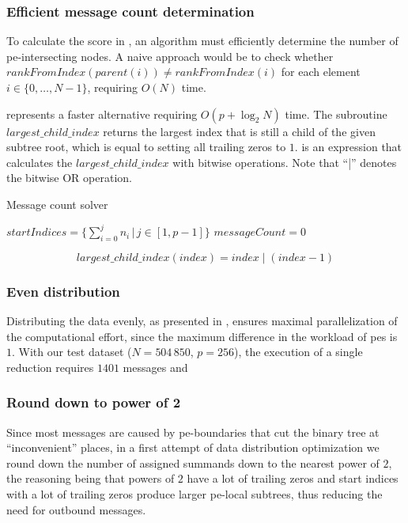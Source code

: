 \subsubsection{Efficient message count determination}
To calculate the score in , an algorithm must efficiently determine the number of \gls{pe}-intersecting nodes.
A naive approach would be to check whether $rankFromIndex(parent(i)) \neq rankFromIndex(i)$ for each element $i \in \{0, \ldots, N-1\}$, requiring $O(N)$ time.

 represents a faster alternative requiring $O(p + \log_2 N)$ time.
The subroutine $largest\_child\_index$ returns the largest index that is still a child of the given subtree root, which is equal to setting all trailing zeros to $1$.
 is an expression that calculates the $largest\_child\_index$ with bitwise operations.
Note that \enquote{|} denotes the bitwise OR operation.
\begin{algorithm}
\caption{Message count solver}\label{algo:MessageCountSolver}
\DontPrintSemicolon
\SetAlgoLined
$startIndices = \{\sum_{i=0}^j n_i \,\big|\, j \in [1, p-1] \}$\;
$messageCount = 0$\;
\end{algorithm}
\begin{equation}
\label{eq:LargestChildIndex}
largest\_child\_index(index) = index \;|\; (index - 1)
\end{equation}


\subsubsection{Even distribution}
Distributing the data evenly, as presented in , ensures maximal parallelization of the computational effort, since the maximum difference in the workload of \glspl{pe} is $1$.
With our test dataset ($N = 504\,850$, $p=256$), the execution of a single reduction requires $1401$ messages and 

\subsubsection{Round down to power of 2}
\label{sec:roundDownPower2Distribution}
Since most messages are caused by \gls{pe}-boundaries that cut the binary tree at \enquote{inconvenient} places, in a first attempt of data distribution
optimization we round down the number of assigned summands down to the nearest power of $2$,
the reasoning being that powers of $2$ have a lot of trailing
zeros and start indices with a lot of trailing zeros produce larger \gls{pe}-local subtrees, thus reducing the need for outbound messages.

